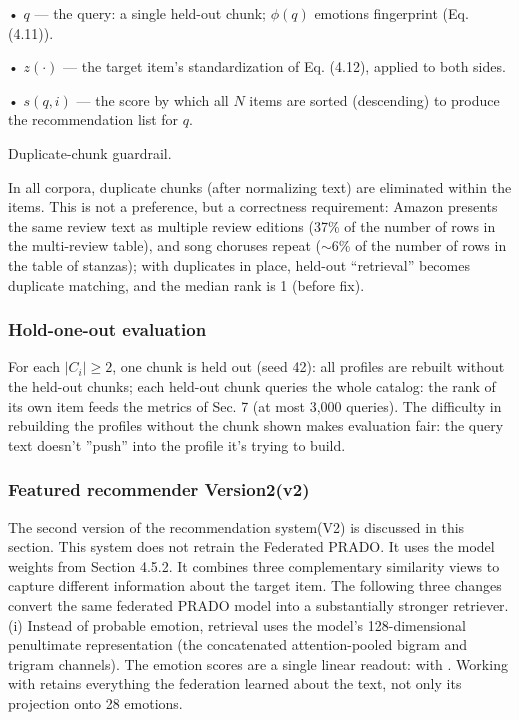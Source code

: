 • $q$ --- the query: a single held-out chunk; $\phi(q)$ emotions fingerprint (Eq. (4.11)).

• $z(\cdot)$ --- the target item's standardization of Eq. (4.12), applied to both sides.

• $s(q, i)$ --- the score by which all $N$ items are sorted (descending) to produce the recommendation list for $q$.

Duplicate-chunk guardrail.

In all corpora, duplicate chunks (after normalizing text) are eliminated within the items. This is not a preference, but a correctness requirement: Amazon presents the same review text as multiple review editions (37\% of the number of rows in the multi-review table), and song choruses repeat ($\sim$6\% of the number of rows in the table of stanzas); with duplicates in place, held-out ``retrieval'' becomes duplicate matching, and the median rank is 1 (before fix).

\subsubsection{Hold-one-out evaluation}
For each $|C_i| \ge 2$, one chunk is held out (seed 42): all profiles are rebuilt without the held-out chunks; each held-out chunk queries the whole catalog: the rank of its own item feeds the metrics of Sec. 7 (at most 3,000 queries). The difficulty in rebuilding the profiles without the chunk shown makes evaluation fair: the query text doesn't ''push'' into the profile it's trying to build.

\subsubsection{Featured recommender Version2(v2)}
The second version of the recommendation system(V2) is discussed in this section. This system does not retrain the Federated PRADO. It uses the model weights from Section 4.5.2. It combines three complementary similarity views to capture different information about the target item. The following three changes convert the same federated PRADO model into a substantially stronger retriever. (i) Instead of probable emotion, retrieval uses the model’s 128-dimensional penultimate representation  (the concatenated attention-pooled bigram and trigram channels). The emotion scores are a single linear readout:  with . Working with  retains everything the federation learned about the text, not only its projection onto 28 emotions.

